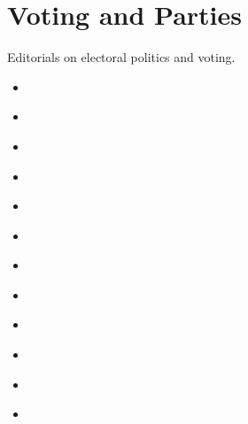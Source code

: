 \documentclass[letterpaper,10pt,english]{jupyterBook}
\begin{document}
\section{Voting and Parties}
\label{\detokenize{Sections/electoral:voting-and-parties}}\label{\detokenize{Sections/electoral::doc}}
\sphinxAtStartPar
Editorials on electoral politics and voting.
\begin{itemize}
\item {} 
\sphinxAtStartPar
{\hyperref[\detokenize{Volumes/04/04/politics::doc}]{}}

\item {} 
\sphinxAtStartPar
{\hyperref[\detokenize{Volumes/15/01/oath_of_the_negro_voter::doc}]{}}

\item {} 
\sphinxAtStartPar
{\hyperref[\detokenize{Volumes/21/02/unreal_campaign::doc}]{}}

\item {} 
\sphinxAtStartPar
{\hyperref[\detokenize{Volumes/22/01/drive::doc}]{}}

\item {} 
\sphinxAtStartPar
{\hyperref[\detokenize{Volumes/28/03/vote::doc}]{}}

\item {} 
\sphinxAtStartPar
{\hyperref[\detokenize{Volumes/28/04/la_follette::doc}]{}}

\item {} 
\sphinxAtStartPar
{\hyperref[\detokenize{Volumes/28/05/naacp_and_parties::doc}]{}}

\item {} 
\sphinxAtStartPar
{\hyperref[\detokenize{Volumes/29/01/how_shall_we_vote::doc}]{}}

\item {} 
\sphinxAtStartPar
{\hyperref[\detokenize{Volumes/34/04/chicago::doc}]{}}

\item {} 
\sphinxAtStartPar
{\hyperref[\detokenize{Volumes/35/11/on_the_fence::doc}]{}}

\item {} 
\sphinxAtStartPar
{\hyperref[\detokenize{Volumes/35/11/third_party::doc}]{}}

\item {} 
\sphinxAtStartPar
{\hyperref[\detokenize{Volumes/39/11/herbert_hoover::doc}]{}}

\end{itemize}
\end{document}
